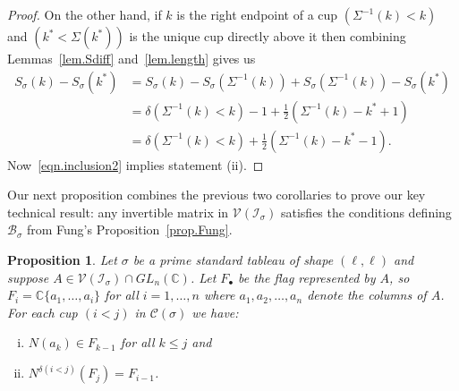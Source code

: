 \documentclass[11pt]{amsart}
\newtheorem{prop}[theorem]{Proposition}
\theoremstyle{remark}
\theoremstyle{remark}
\theoremstyle{definition}
\theoremstyle{definition}
\theoremstyle{definition}
\numberwithin{equation}{section}
\newcommand{\C}{\mathbb{C}}           %
\newcommand{\gd}{\delta}
\newcommand{\gs}{\sigma}
\newcommand{\cc}{\mathcal{C}}
\newcommand{\ci}{\mathcal{I}}
\newcommand{\cv}{\mathcal{V}}
\newcommand{\SF}{\mathcal{B}}
\newcommand{\E}{\Sigma}
\begin{document}
\begin{proof}
On the other hand, if $k$ is the right endpoint of a cup $(\E^{-1}(k)<k)$ and $(k^*<\E(k^*))$ is the unique cup directly above it then combining Lemmas~\ref{lem.Sdiff} and~\ref{lem.length} gives us
\begin{align*}
S_\gs(k)-S_\gs(k^*) &= S_\gs(k)-S_{\gs}(\E^{-1}(k)) + S_{\gs}(\E^{-1}(k)) - S_\gs(k^*) \\
&= \gd(\E^{-1}(k)<k) -1 + \frac{1}{2}\left(\E^{-1}(k)-k^*+1\right) \\
&= \gd(\E^{-1}(k)<k) + \frac{1}{2}\left(\E^{-1}(k)-k^*-1\right). 
\end{align*}
Now~\eqref{eqn.inclusion2} implies statement (ii). 
\end{proof}

Our next proposition combines the previous two corollaries to prove our key technical result: any invertible matrix in $\cv(\ci_\gs)$ satisfies the conditions defining $\SF_\gs$ from Fung's Proposition~\ref{prop.Fung}.


\begin{prop}\label{prop.components} Let $\gs$ be a prime standard tableau of shape $(\ell,\ell)$ and suppose $A\in \cv(\ci_\gs) \cap GL_n(\C)$. Let $F_\bullet$ be the flag represented by $A$, so $F_i = \C\{a_1, \ldots, a_i\}$ for all $i=1, \ldots, n$ where $a_1, a_2, \ldots, a_n$ denote the columns of $A$. For each cup $(i<j)$ in $\cc(\sigma)$ we have:
\begin{enumerate}[(i)]
\item \label{prop:bigprop1} $N\left(a_k\right)\in F_{k-1}$ for all $k\leq j$ and
\item \label{prop:bigprop2} $N^{\gd(i<j)}\left(F_j\right) = F_{i-1}$.
\end{enumerate}
\end{prop}
\end{document}
